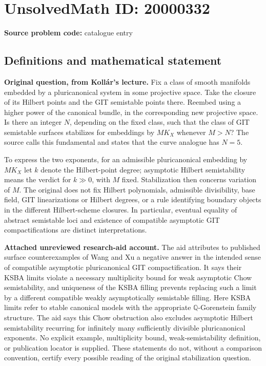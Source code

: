 \documentclass[11pt]{article}
\newcommand{\Q}{\mathbb{Q}}
\begin{document}
\section*{UnsolvedMath ID: 20000332}
\textbf{Source problem code:} catalogue entry
\subsection{Definitions and mathematical statement}
\textbf{Original question, from Kollár's lecture.} Fix a class of smooth manifolds embedded by a pluricanonical system in some projective space. Take the closure of its Hilbert points and the GIT semistable points there. Reembed using a higher power of the canonical bundle, in the corresponding new projective space. Is there an integer $N$, depending on the fixed class, such that the class of GIT semistable surfaces stabilizes for embeddings by $MK_X$ whenever $M>N$? The source calls this fundamental and states that the curve analogue has $N=5$.

To express the two exponents, for an admissible pluricanonical embedding by $MK_X$ let $k$ denote the Hilbert-point degree; asymptotic Hilbert semistability means the verdict for $k\gg0$, with $M$ fixed. Stabilization then concerns variation of $M$. The original does not fix Hilbert polynomials, admissible divisibility, base field, GIT linearizations or Hilbert degrees, or a rule identifying boundary objects in the different Hilbert-scheme closures. In particular, eventual equality of abstract semistable loci and existence of compatible asymptotic GIT compactifications are distinct interpretations.

\textbf{Attached unreviewed research-aid account.} The aid attributes to published surface counterexamples of Wang and Xu a negative answer in the intended sense of compatible asymptotic pluricanonical GIT compactification. It says their KSBA limits violate a necessary multiplicity bound for weak asymptotic Chow semistability, and uniqueness of the KSBA filling prevents replacing such a limit by a different compatible weakly asymptotically semistable filling. Here KSBA limits refer to stable canonical models with the appropriate $\Q$-Gorenstein family structure. The aid says this Chow obstruction also excludes asymptotic Hilbert semistability recurring for infinitely many sufficiently divisible pluricanonical exponents. No explicit example, multiplicity bound, weak-semistability definition, or publication locator is supplied. These statements do not, without a comparison convention, certify every possible reading of the original stabilization question.
\end{document}
